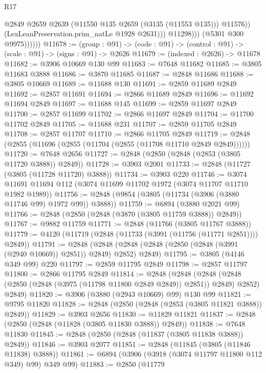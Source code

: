 \begin{lexlean}{R17}
\begin{coremodule}
                            @2849
                            @2659
                            @2639
                            (@11550 @135 @2659 (@3135 (@11553 @135)))
                            @11576))
                        (LexLeanPreservation.prim_natLe @1928 @2631)))
                    @11298)))
              (@5301 @300 @9975))))))
@11678 := (group : @91) ->
  (code : @91) -> (control : @91) -> (scale : @91) -> (signs : @91) -> @2626
@11679 := (indexed : @2626) -> @11678
@11682 := @3906 @10669 @130 @99
@11683 := @7648 @11682
@11685 := @3805 @11683 @3888
@11686 := @3870 @11685
@11687 := @2848 @11686
@11688 := @3805 @10669
@11689 := @11688 @130
@11691 := @2859 @11689 @2849
@11692 := @2857 @11691
@11694 := @2866 @11689 @2849
@11696 := @11692 @11694 @2849
@11697 := @11688 @145
@11699 := @2859 @11697 @2849
@11700 := @2857 @11699
@11702 := @2866 @11697 @2849
@11704 := @11700 @11702 @2849
@11705 := @11688 @231
@11707 := @2859 @11705 @2849
@11708 := @2857 @11707
@11710 := @2866 @11705 @2849
@11719 := @2848 (@2855 (@11696 (@2855 (@11704 (@2855 (@11708 @11710 @2849 @2849))))))
@11720 := @7648 @2656
@11727 := @2848 (@2850 (@2848 (@2853 (@3805 @11720 @3888)) @2849))
@11728 := @3903 @2001
@11733 := @2848 (@11727 (@3805 (@11728 @11720) @3888))
@11734 := @3903 @220
@11746 := @3074 @11691 @11694 @112 (@3074 @11699 @11702 @1972 (@3074 @11707 @11710 @1982 @1989))
@11756 := @2848 (@9854 (@3805 (@11734 (@3906 (@3880 @11746 @99) @1972 @99)) @3888))
@11759 := @6894 (@3880 @2021 @99)
@11766 := @2848 (@2850 (@2848 (@3870 (@3805 @11759 @3888)) @2849))
@11767 := @9882 @11759
@11771 := @2848 (@11766 (@3805 @11767 @3888))
@11779 := @4120 (@11719 (@2848 (@11733 (@3991 (@11756 (@11771 @2851)))) @2849))
@11791 := @2848
    (@2848 (@2848 (@2848 (@2850 (@2848 (@3991 (@2940 @10669)) @2851)) @2849) @2852) @2849)
@11795 := @3805 (@4146 @349 @99) @220
@11797 := @2859 @11795 @2849
@11798 := @2857 @11797
@11800 := @2866 @11795 @2849
@11814 := @2848
    (@2848
      (@2848 (@2848 (@2850 (@2848 (@3975 (@11798 @11800 @2849 @2849)) @2851)) @2849) @2852)
      @2849)
@11820 := @3906 (@3880 (@2943 @10669) @99) @130 @99
@11821 := @9795 @11820
@11828 := @2848 (@2850 (@2848 (@2853 (@3805 @11821 @3888)) @2849))
@11829 := @3903 @2656
@11830 := @11829 @11821
@11837 := @2848 (@2850 (@2848 (@11828 (@3805 @11830 @3888)) @2849))
@11838 := @7648 @11830
@11845 := @2848 (@2850 (@2848 (@11837 (@3805 @11838 @3888)) @2849))
@11846 := @3903 @2077
@11851 := @2848 (@11845 (@3805 (@11846 @11838) @3888))
@11861 := @6894 (@3906 (@3918 (@3074 @11797 @11800 @112 @349) @99) @349 @99)
@11883 := @2850
    (@11779

\end{coremodule}
\end{lexlean}

